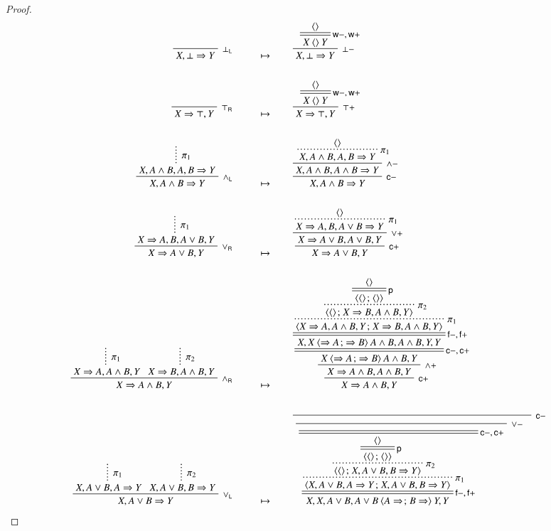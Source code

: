 \begin{proof}
\begin{align*}
    \R[\rsf{\bot_L}]
      {}
      {X, \bot \seq Y}
    &\mt
    \R[\rsf{\bot{-}}]
    {\prftree[r][d]{\rsf{w{-},w{+}}}
    {\piq{}}
    {X \piq{} Y}}
    {X, \bot \seq Y}
    \\\\
    \R[\rsf{\top_R}]
      {}
      {X \seq \top, Y}
    &\mt
    \R[\rsf{\top{+}}]
    {\prftree[r][d]{\rsf{w{-},w{+}}}
    {\piq{}}
    {X \piq{} Y}}
    {X \seq \top, Y}
    \\\\
    \R[\rsf{\land_L}]
      {\summ[$\pi_1$]{X, A \land B, A, B \seq Y}}
      {X, A \land B \seq Y}
    &\mt
    \R[\rsf{c{-}}]
    {\R[\rsf{\land{-}}]
    {\prftree[r][dotted]{$\pi_1$}
    {\piq{}}
    {X, A \land B, A, B \seq Y}}
    {X, A \land B, A \land B \seq Y}}
    {X, A \land B \seq Y}
    \\\\
    \R[\rsf{\lor_R}]
      {\summ[$\pi_1$]{X \seq A, B, A \lor B, Y}}
      {X \seq A \lor B, Y}
    &\mt
    \R[\rsf{c{+}}]
    {\R[\rsf{\lor{+}}]
    {\prftree[r][dotted]{$\pi_1$}
    {\piq{}}
    {X \seq A, B, A \lor B \seq Y}}
    {X \seq A \lor B, A \lor B, Y}}
    {X \seq A \lor B, Y}
    \\\\
    \R[\rsf{\land_R}]
      {\summ[$\pi_1$]{X \seq A, A \land B, Y}}
      {\summ[$\pi_2$]{X \seq B, A \land B, Y}}
      {X \seq A \land B, Y}
    &\mt
    \R[\rsf{c{+}}]
    {\R[\rsf{\land{+}}]
    {\prftree[r][d]{\rsf{c{-},c{+}}}
    {\prftree[r][d]{\rsf{f{-},f{+}}}
    {\prftree[r][dotted]{$\pi_1$}
    {\prftree[r][dotted]{$\pi_2$}
    {\prftree[r][d]{\rsf{p}}
    {\piq{}}
    {\piq{\piq{} \sep \piq{}}}}
    {\piq{\piq{} \sep X \seq B, A \land B, Y}}}
    {\piq{X \seq A, A \land B, Y \sep X \seq B, A \land B, Y}}}
    {X, X \piq{\seq A \sep \seq B} A \land B, A \land B, Y, Y}}
    {X \piq{\seq A \sep \seq B} A \land B, Y}}
    {X \seq A \land B, A \land B, Y}}
    {X \seq A \land B, Y}
    \\\\
    \R[\rsf{\lor_L}]
      {\summ[$\pi_1$]{X, A \lor B, A \seq Y}}
      {\summ[$\pi_2$]{X, A \lor B, B \seq Y}}
      {X, A \lor B \seq Y}
    &\mt
    \R[\rsf{c{-}}]
    {\R[\rsf{\lor{-}}]
    {\prftree[r][d]{\rsf{c{-},c{+}}}
    {\prftree[r][d]{\rsf{f{-},f{+}}}
    {\prftree[r][dotted]{$\pi_1$}
    {\prftree[r][dotted]{$\pi_2$}
    {\prftree[r][d]{\rsf{p}}
    {\piq{}}
    {\piq{\piq{} \sep \piq{}}}}
    {\piq{\piq{} \sep X, A \lor B, B \seq Y}}}
    {\piq{X, A \lor B, A \seq Y \sep X, A \lor B, B \seq Y}}}
    {X, X, A \lor B, A \lor B \piq{A \seq \sep B \seq} Y, Y}}
}}
\end{align*}
\end{proof}
